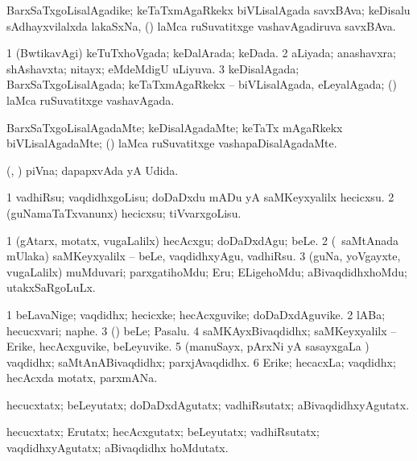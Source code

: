 \bentry
{}
\gl{\nA}
\bmng
BarxSaTxgoLisalAgadike; keTaTxmAgaRkekx biVLisalAgada savxBAva; keDisalu sAdhayxvilalxda lakaSxNa, (\kanmu) laMca ruSuvatitxge vashavAgadiruva savxBAva. 
\emng
\eentry

\bentry
{}
\gl{\gu}
\bmng
\bnum
\num{1} (BwtikavAgi) keTuTxhoVgada; keDalArada; keDada. 
\num{2} aLiyada; anashavxra; shAshavxta; nitayx; eMdeMdigU uLiyuva. 
\num{3} keDisalAgada; BarxSaTxgoLisalAgada; keTaTxmAgaRkekx -- biVLisalAgada, eLeyalAgada; (\kanmu) laMca ruSuvatitxge vashavAgada. 
\enum
\emng
\eentry

\bentry
{}
\gl{\kirxvi}
\bmng
BarxSaTxgoLisalAgadaMte; keDisalAgadaMte; keTaTx mAgaRkekx biVLisalAgadaMte; (\kanmu) laMca ruSuvatitxge vashapaDisalAgadaMte. 
\emng
\eentry

\bentry
{}
\gl{\gu}
\bmng
(\savi, \jiVvi) piVna; dapapxvAda yA Udida. 
\emng
\eentry

\bentry
{}
\gl{\sakirx}
\bmng
\bnum
\num{1} vadhiRsu; vaqdidhxgoLisu; doDaDxdu mADu yA saMKeyxyalilx hecicxsu. 
\num{2} (guNamaTaTxvanunx) hecicxsu; tiVvarxgoLisu. 
\enum
\emng

\noindent
\gl{\akirx}
\bmng
\bnum
\num{1} (gAtarx, motatx, \mo vugaLalilx) hecAcxgu; doDaDxdAgu; beLe. 
\num{2} (\kanmu\ saMtAnada mUlaka) saMKeyxyalilx -- beLe, vaqdidhxyAgu, vadhiRsu. 
\num{3} (guNa, yoVgayxte, \mo vugaLalilx) muMduvari; parxgatihoMdu; Eru; ELigehoMdu; aBivaqdidhxhoMdu; utakxSaRgoLuLx. 
\enum
\emng
\eentry

\bentry
{}
\gl{\nA}
\bmng
\bnum
\num{1} beLavaNige; vaqdidhx; hecicxke; hecAcxguvike; doDaDxdAguvike. 
\num{2} lABa; hecucxvari; naphe. 
\num{3} (\pArxparx) beLe; Pasalu. 
\num{4} saMKAyxBivaqdidhx; saMKeyxyalilx -- Erike, hecAcxguvike, beLeyuvike. 
\num{5} (manuSayx, pArxNi yA sasayxgaLa \vi) vaqdidhx; saMtAnABivaqdidhx; parxjAvaqdidhx. 
\num{6} Erike; hecacxLa; vaqdidhx; hecAcxda motatx, parxmANa. 
\enum
\emng

\noindent
\gl{\pagu}
\bmng
{} hecucxtatx; beLeyutatx; doDaDxdAgutatx; vadhiRsutatx; aBivaqdidhxyAgutatx. 
\emng
\eentry

\bentry
{}
\gl{\kirxvi}
\bmng
hecucxtatx; Erutatx; hecAcxgutatx; beLeyutatx; vadhiRsutatx; vaqdidhxyAgutatx; aBivaqdidhx hoMdutatx. 
\emng
\eentry

